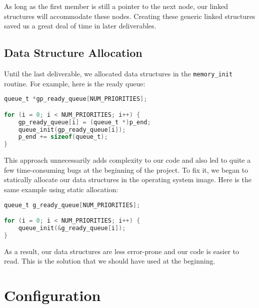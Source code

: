 \documentclass[12pt]{report}
\begin{document}
As long as the first member is still a pointer to the next node, our linked structures will accommodate these nodes. Creating these generic linked structures saved us a great deal of time in later deliverables.

\section{Data Structure Allocation}

Until the last deliverable, we allocated data structures in the \texttt{memory_init} routine. For example, here is the ready queue:

\begin{minipage}{\textwidth}
\begin{lstlisting}[language=C, frame=single]
queue_t *gp_ready_queue[NUM_PRIORITIES];

for (i = 0; i < NUM_PRIORITIES; i++) {
    gp_ready_queue[i] = (queue_t *)p_end;
    queue_init(gp_ready_queue[i]);
    p_end += sizeof(queue_t);
}
\end{lstlisting}
\end{minipage}

This approach unnecessarily adds complexity to our code and also led to quite a few time-consuming bugs at the beginning of the project. To fix it, we began to statically allocate our data structures in the operating system image. Here is the same example using static allocation:

\begin{minipage}{\textwidth}
\begin{lstlisting}[language=C, frame=single]
queue_t g_ready_queue[NUM_PRIORITIES];

for (i = 0; i < NUM_PRIORITIES; i++) {
    queue_init(&g_ready_queue[i]);
}
\end{lstlisting}
\end{minipage}

As a result, our data structures are less error-prone and our code is easier to read. This is the solution that we should have used at the beginning.

\appendix


\chapter{Configuration}
\label{app:configuration}
\end{document}
